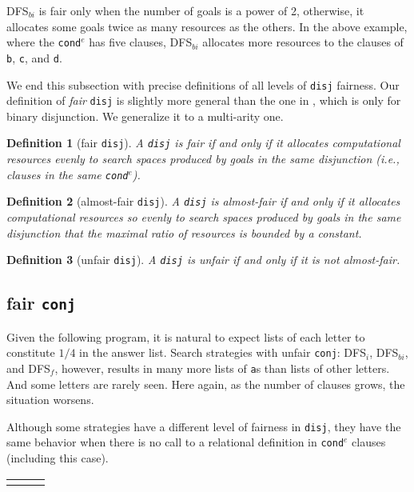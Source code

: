 \documentclass[format=acmlarge, review=true, authordraft=true]{acmart}
\newcommand{\conde}{\texttt{cond$^e$}}
\newcommand{\conj}{\texttt{conj}}
\newcommand{\disj}{\texttt{disj}}
\newcommand{\DFSi }[0]{DFS$_{i}$}
\newcommand{\DFSf }[0]{DFS$_{f}$}
\newcommand{\DFSbi}[0]{DFS$_{bi}$}
\newtheorem{defn}{Definition}[section]
\begin{document}
\DFSbi{} is fair only when the number of goals is a power of 2, 
otherwise, it allocates some goals twice as many resources as the 
others. In the above example, where the \conde{} has five clauses, \DFSbi{} 
allocates more resources to the clauses of \texttt{b}, \texttt{c}, and 
\texttt{d}.

We end this subsection with precise definitions of all levels of 
\disj{} fairness. Our definition of \emph{fair} \disj{} is slightly 
more general
than the one in \citet{seres1999algebra}, which is only
for binary disjunction. We generalize it to a multi-arity one.

\begin{defn}[fair \disj{}]
A \disj{} is fair if and only if it allocates computational resources evenly to 
search spaces produced by goals in the same disjunction 
(i.e., clauses in the same \conde).
\end{defn}

\begin{defn}[almost-fair \disj{}]
A \disj{} is almost-fair if and only if it allocates computational resources
so evenly to search spaces produced by goals in the same disjunction that 
the maximal ratio of resources is bounded by a constant.
\end{defn}

\begin{defn}[unfair \disj{}]
A \disj{} is unfair if and only if it is not almost-fair.
\end{defn}

\subsection{fair \texttt{conj}}
\label{sec:fairconj}

Given the following program, it is natural to expect lists of each letter to
constitute $1/4$ in the answer list. Search strategies with unfair \conj{}:
\DFSi, \DFSbi, and \DFSf, however, results in many more lists of \texttt{a}s than 
lists of other letters. And some letters are rarely seen. Here again, as the
number of clauses grows, the situation worsens. 

Although some strategies have a different level of fairness in \disj{}, they 
have the same behavior when there is no call to a relational definition in 
\conde{} clauses (including this case).

\begin{center}
\begin{tabular}{l|c|r}
     &
     &
     \\
\end{tabular}
\end{center}
\end{document}
